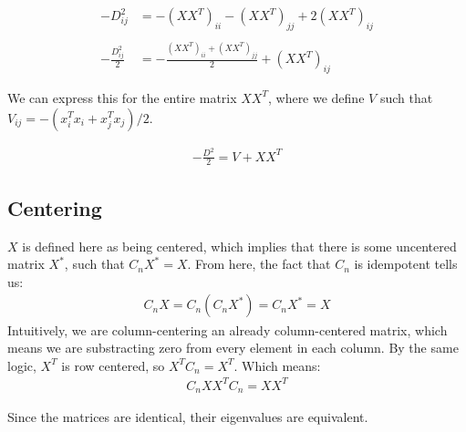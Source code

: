 \documentclass[a4paper]{article}
\begin{document}
\begin{align*}
-D_{ij}^2 &= - \left(XX^T\right)_{ii} - \left(XX^T\right)_{jj} + 2\left(XX^T\right)_{ij}\\\\
-\frac{D_{ij}^2}{2} &= - \frac{\left(XX^T\right)_{ii} + \left(XX^T\right)_{jj}}{2} 
                     + \left(XX^T\right)_{ij}
\end{align*}

We can express this for the entire matrix $XX^T$, where we define
$V$ such that $V_{ij} = -\left(x_i^Tx_i + x_j^Tx_j\right)/2$.

\begin{align*}
-\frac{D^2}{2} = V + XX^T
\end{align*}

\subsection{Centering}
$X$ is defined here as being centered, which implies that there is
some uncentered matrix $X^*$, such that $C_nX^* = X$.  From here,
the fact that $C_n$ is idempotent tells us:
\begin{align*}
  C_n X = C_n\left(C_nX^*\right) =  C_nX^* = X
\end{align*}
Intuitively, we are column-centering an already column-centered matrix, which means
we are substracting zero from every element in each column.  By the same logic,
$X^T$ is row centered, so $X^TC_n = X^T$.  Which means:
\begin{align*}
  C_nXX^TC_n = XX^T
\end{align*}

Since the matrices are identical, their eigenvalues are equivalent.\\
\end{document}
